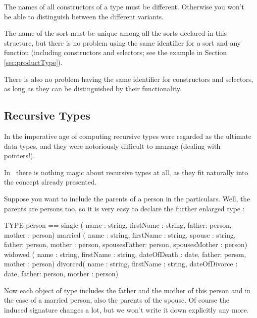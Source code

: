 The names of all constructors of a type must be different. 
Otherwise you won't be able to distinguish between the different
variants.

The name of the sort must be unique among all the sorts declared in this
structure, but there is no problem using the same identifier for a sort and
any function (including constructors and selectors; see the example in
Section \ref{sec:productType}). 

There is also no problem having the same identifier for constructors and
selectors, as long as they can be distinguished by their functionality.


\subsection{Recursive Types}
\label{sec:recType}
\advanced
In the imperative age of computing recursive types were regarded
as the ultimate data types, and they were notoriously difficult to
manage (dealing with pointers!).

In \opal\ there is nothing magic about recursive types at all, as they fit
naturally into the concept already presented.

Suppose you want to include the parents of a person in the
particulars.
Well, the parents are persons too, so it is very easy to declare the
further enlarged  type : 
\begin{prog}
       TYPE person == single  ( name : string, firstName : string,
                                father: person, mother : person)
                      married ( name : string, firstName : string,
                                spouse : string,
                                father: person, mother : person,
                                spousesFather: person, 
                                spousesMother : person)
                      widowed ( name : string, firstName : string,
                                dateOfDeath : date,
                                father: person, mother : person)
                      divorced( name : string, firstName : string,
                                dateOfDivorce : date,
                                father: person, mother : person)
\end{prog}
Now each object of type  includes the father and the
mother of this person and in the case of a married person, also the parents
of the spouse.
Of course the induced signature changes a lot, but we won't write it
down explicitly any more.  

